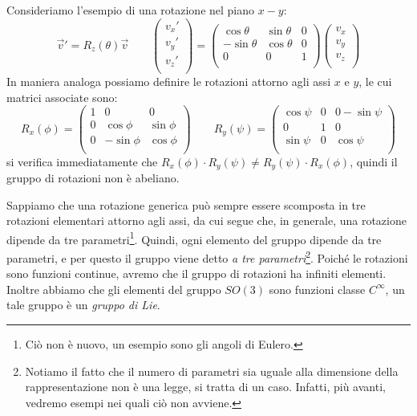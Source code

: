 Consideriamo l'esempio di una rotazione nel piano $x-y$: 
\begin{equation}
    \Vec{v}'=R_z(\theta)\Vec{v}\qquad
    \begin{pmatrix}
v_x'   \\
v_y'   \\
 v_z'  \\
\end{pmatrix}
=    \begin{pmatrix}
 \cos{\theta}&\sin{\theta}&0  \\
  -\sin{\theta}&\cos{\theta}&0\\
0&0&1\\
\end{pmatrix}
\begin{pmatrix}
v_x \\
v_y   \\
 v_z  \\
\end{pmatrix}
\end{equation}
In maniera analoga possiamo definire le rotazioni attorno agli assi $x$ e $y$, le cui matrici associate sono:
\begin{equation}
  R_x(\phi)= \begin{pmatrix}
  1&0&0\\
0& \cos{\phi}&\sin{\phi} \\
 0& -\sin{\phi}&\cos{\phi}\\
\end{pmatrix}\qquad
  R_y(\psi)= \begin{pmatrix}
 \cos{\psi}&0&0-\sin{\psi} \\
 0&1&0\\
  \sin{\psi}&0&\cos{\psi}\\
\end{pmatrix}
\end{equation}
si verifica immediatamente che $ R_x(\phi)\cdot R_y(\psi)\neq R_y(\psi)\cdot R_x(\phi)$, quindi il gruppo di rotazioni non è abeliano.

Sappiamo che una rotazione generica può sempre essere scomposta in tre rotazioni elementari attorno agli assi, da cui segue che, in generale, una rotazione dipende da tre parametri\footnote{Ciò non è nuovo, un esempio sono gli angoli di Eulero.}. Quindi, ogni elemento del gruppo dipende da tre parametri, e per questo il gruppo viene detto \textit{a tre parametri}\footnote{Notiamo il fatto che il numero di parametri sia uguale alla dimensione della rappresentazione non è una legge, si tratta di un caso. Infatti, più avanti, vedremo esempi nei quali ciò non avviene.}. 
Poiché le rotazioni sono funzioni continue, avremo che il gruppo di rotazioni ha infiniti elementi. Inoltre abbiamo che gli elementi del gruppo $SO(3)$ sono funzioni classe $C^\infty$, un tale gruppo è un \textit{gruppo di Lie}.

